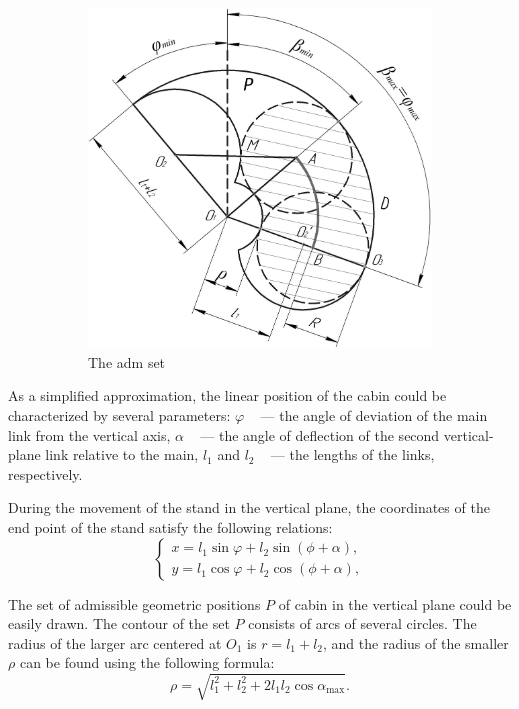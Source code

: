 \documentclass[journal,twocolumn]{IEEEtran}
\begin{document}
\begin{figure}[!h]
\begin{subfigure}{0.35\textwidth}
        \includegraphics[width = \linewidth]{Figures/posSet.jpg}
        \caption{The adm set}
        \label{fig:posVert}
    \end{subfigure}
    \caption{}
\end{figure}

As a simplified approximation, the linear position of the cabin could be characterized by several parameters: $\varphi$ ~ --- the angle of deviation of the main link from the vertical axis, $\alpha$ ~ --- the angle of deflection of the second vertical-plane link relative to the main, $l_1$ and $l_2$ ~ --- the lengths of the links, respectively.

During the movement of the stand in the vertical plane, the coordinates of the end point of the stand satisfy the following relations:
\begin{equation}
    \begin{cases}
        x = l_1\sin\varphi + l_2\sin(\phi + \alpha),
        \\
        y = l_1\cos\varphi + l_2\cos(\phi + \alpha),
    \end{cases}
    \label{eq:point_coords}
\end{equation}

The set of admissible geometric positions $P$ of cabin in the vertical plane could be easily drawn. The contour of the set $ P $ consists of arcs of several circles. The radius of the larger arc centered at $ O_1 $ is $ r = l_1 + l_2 $, and the radius of the smaller $ \rho $ can be found using the following formula:
\begin{equation}
    \rho = \sqrt{l_1^2 + l_2^2 + 2 l_1 l_2 \cos\alpha_{\max}}.
\end{equation}
\end{document}
